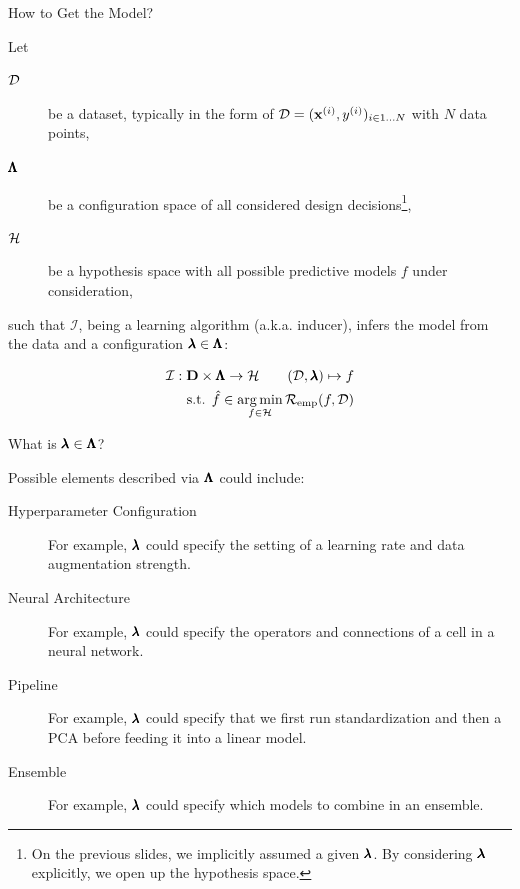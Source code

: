 \documentclass[main]{subfiles}
\begin{document}
\begin{frame}[c]{How to Get the Model?}

Let  

\begin{description}
    \item[$\mathcal{D}$] be a dataset, typically in the form of $\mathcal{D} = (\mathbf{x}^{(i)},y^{(i)})_{i \in 1 \ldots N}$ with $N$ data points,
    \item[$\pmb{\Lambda}$] be a configuration space of all considered design decisions\footnote{On the previous slides, we implicitly assumed a given $\pmb{\lambda}$. By considering $\pmb{\lambda}$ explicitly, we open up the hypothesis space.}, 
    \item[$\mathcal{H}$] be a hypothesis space with all possible predictive models $f$ under consideration, 
\end{description}

such that $\mathcal{I}$, being a learning algorithm (a.k.a. inducer), infers the model from the data and a configuration $\pmb{\lambda} \in \pmb{\Lambda}$:

\vspace*{-1em}
\begin{eqnarray}
\mathcal{I}: \mathbf{D} \times \pmb{\Lambda} \to \mathcal{H} \qquad (\mathcal{D}, \pmb{\lambda}) \mapsto f\\
\text{s.t. } \hat{f} \in \operatorname*{arg\,min}_{f \in \mathcal{H}} \mathcal{R}_{\text{emp}}(f,  \mathcal{D})
\end{eqnarray}

\end{frame}
\begin{frame}[c]{What is $\pmb{\lambda} \in \pmb{\Lambda}$?}

Possible elements described via $\pmb{\Lambda}$ could include:
 
\begin{description}
    \item[Hyperparameter Configuration] For example, $\pmb{\lambda}$ could specify the setting of a learning rate and data augmentation strength.
    \item[Neural Architecture] For example, $\pmb{\lambda}$ could specify the operators and connections of a cell in a neural network.
    \item[Pipeline] For example, $\pmb{\lambda}$ could specify that we first run standardization and then a PCA before feeding it into a linear model.
    \item[Ensemble] For example, $\pmb{\lambda}$ could specify which models to combine in an ensemble.
\end{description}

\end{frame}
\end{document}

